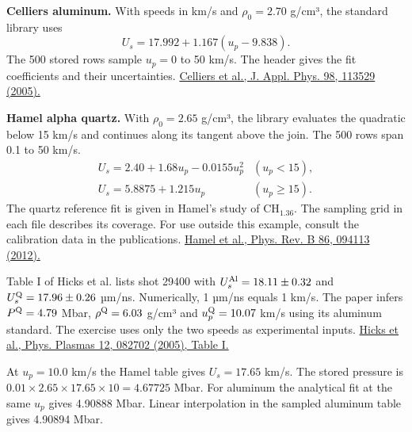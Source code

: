 \textbf{Celliers aluminum.} With speeds in km/s and $\rho_0=2.70$ g/cm³, the standard library uses
\[
 U_s=17.992+1.167(u_p-9.838).
\]
The 500 stored rows sample $u_p=0$ to 50 km/s. The header gives the fit coefficients and their uncertainties. \href{https://doi.org/10.1063/1.2140077}{Celliers et al., J. Appl. Phys. 98, 113529 (2005).}

\textbf{Hamel alpha quartz.} With $\rho_0=2.65$ g/cm³, the library evaluates the quadratic below 15 km/s and continues along its tangent above the join. The 500 rows span 0.1 to 50 km/s.
\[
\begin{array}{ll}
U_s=2.40+1.68u_p-0.0155u_p^2 & (u_p<15),\\
U_s=5.8875+1.215u_p & (u_p\geq15).
\end{array}
\]
The quartz reference fit is given in Hamel's study of CH$_{1.36}$. The sampling grid in each file describes its coverage. For use outside this example, consult the calibration data in the publications. \href{https://doi.org/10.1103/PhysRevB.86.094113}{Hamel et al., Phys. Rev. B 86, 094113 (2012).}

Table I of Hicks et al. lists shot 29400 with $U_s^{\rm Al}=18.11\pm0.32$ and $U_s^{\rm Q}=17.96\pm0.26$ µm/ns. Numerically, 1 µm/ns equals 1 km/s. The paper infers $P^{\rm Q}=4.79$ Mbar, $\rho^{\rm Q}=6.03$ g/cm³ and $u_p^{\rm Q}=10.07$ km/s using its aluminum standard. The exercise uses only the two speeds as experimental inputs. \href{https://doi.org/10.1063/1.2009528}{Hicks et al., Phys. Plasmas 12, 082702 (2005), Table I.}

At $u_p=10.0$ km/s the Hamel table gives $U_s=17.65$ km/s. The stored pressure is $0.01\times2.65\times17.65\times10=4.67725$ Mbar. For aluminum the analytical fit at the same $u_p$ gives 4.90888 Mbar. Linear interpolation in the sampled aluminum table gives 4.90894 Mbar.
